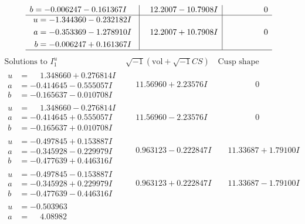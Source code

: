 \documentclass[1p]{elsarticle_modified}
\theoremstyle{definition}
\newcommand{\I}{\sqrt{-1}}
\begin{document}
$$\begin{array}{c|c|c}
\begin{aligned}
b &= -0.006247 - 0.161367 I\end{aligned}
 & \phantom{-}12.2007 - 10.7908 I & \phantom{-0.000000 } 0 \\ \hline\begin{aligned}
u &= -1.344360 - 0.232182 I \\
a &= -0.353369 - 1.278910 I \\
b &= -0.006247 + 0.161367 I\end{aligned}
 & \phantom{-}12.2007 + 10.7908 I & \phantom{-0.000000 } 0\\
 \hline 
 \end{array}$$\newpage$$\begin{array}{c|c|c}  
\text{Solutions to }I^u_{1}& \I (\text{vol} + \sqrt{-1}CS) & \text{Cusp shape}\\
 \hline 
\begin{aligned}
u &= \phantom{-}1.348660 + 0.276814 I \\
a &= -0.414645 - 0.555057 I \\
b &= -0.165637 - 0.010708 I\end{aligned}
 & \phantom{-}11.56960 + 2.23576 I & \phantom{-0.000000 } 0 \\ \hline\begin{aligned}
u &= \phantom{-}1.348660 - 0.276814 I \\
a &= -0.414645 + 0.555057 I \\
b &= -0.165637 + 0.010708 I\end{aligned}
 & \phantom{-}11.56960 - 2.23576 I & \phantom{-0.000000 } 0 \\ \hline\begin{aligned}
u &= -0.497845 + 0.153887 I \\
a &= -0.345928 - 0.229979 I \\
b &= -0.477639 + 0.446316 I\end{aligned}
 & \phantom{-}0.963123 - 0.222847 I & \phantom{-}11.33687 + 1.79100 I \\ \hline\begin{aligned}
u &= -0.497845 - 0.153887 I \\
a &= -0.345928 + 0.229979 I \\
b &= -0.477639 - 0.446316 I\end{aligned}
 & \phantom{-}0.963123 + 0.222847 I & \phantom{-}11.33687 - 1.79100 I \\ \hline\begin{aligned}
u &= -0.503963\phantom{ +0.000000I} \\
a &= \phantom{-}4.08982\phantom{ +0.000000I} \\

\end{aligned}
\end{array}$$
\end{document}
